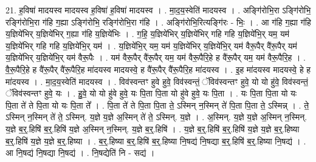 \documentclass[17pt]{extarticle}
\begin{document}
21. ह॒विषा॑ मादयस्व मादयस्व ह॒विषा॑ ह॒विषा॑ मादयस्व । . मा॒द॒य॒स्वेति॑ मादयस्व । . अङ्गि॑रोभि॒रा ऽङ्गि॑रोभि॒ रङ्गि॑रोभि॒रा ग॑हि ग॒ह्या ऽङ्गि॑रोभि॒ रङ्गि॑रोभि॒रा ग॑हि । . अङ्गि॑रोभि॒रित्यङ्गि॑रः - भिः॒ । . आ ग॑हि ग॒ह्या ग॑हि य॒ज्ञिये॑भिर् य॒ज्ञिये॑भिर् ग॒ह्या ग॑हि य॒ज्ञिये॑भिः । . ग॒हि॒ य॒ज्ञिये॑भिर् य॒ज्ञिये॑भिर् गहि गहि य॒ज्ञिये॑भि॒र् यम॒ यम॑ य॒ज्ञिये॑भिर् गहि गहि य॒ज्ञिये॑भि॒र् यम॑ । . य॒ज्ञिये॑भि॒र् यम॒ यम॑ य॒ज्ञिये॑भिर् य॒ज्ञिये॑भि॒र् यम॑ वैरू॒पैर् वै॑रू॒पैर् यम॑ य॒ज्ञिये॑भिर् य॒ज्ञिये॑भि॒र् यम॑ वैरू॒पैः । . यम॑ वैरू॒पैर् वै॑रू॒पैर् यम॒ यम॑ वैरू॒पैरि॒हे ह वै॑रू॒पैर् यम॒ यम॑ वैरू॒पैरि॒ह । . वै॒रू॒पैरि॒हे ह वै॑रू॒पैर् वै॑रू॒पैरि॒ह मा॑दयस्व मादयस्वे॒ ह वै॑रू॒पैर् वै॑रू॒पैरि॒ह मा॑दयस्व । . इ॒ह मा॑दयस्व मादयस्वे॒ हे ह मा॑दयस्व । . मा॒द॒य॒स्वेति॑ मादयस्व । . विव॑स्वन्तꣳ हुवे हुवे॒ विव॑स्वन्तं॒ ॅविव॑स्वन्तꣳ हुवे॒ यो यो हु॑वे॒ विव॑स्वन्तं॒ ॅविव॑स्वन्तꣳ हुवे॒ यः । . हु॒वे॒ यो यो हु॑वे हुवे॒ यः पि॒ता पि॒ता यो हु॑वे हुवे॒ यः पि॒ता । . यः पि॒ता पि॒ता यो यः पि॒ता ते॑ ते पि॒ता यो यः पि॒ता ते᳚ । . पि॒ता ते॑ ते पि॒ता पि॒ता ते॒ ऽस्मिन् न॒स्मिन् ते॑ पि॒ता पि॒ता ते॒ ऽस्मिन्न् । . ते॒ ऽस्मिन् न॒स्मिन् ते॑ ते॒ ऽस्मिन्. य॒ज्ञे य॒ज्ञे अ॒स्मिन् ते॑ ते॒ ऽस्मिन्. य॒ज्ञे । . अ॒स्मिन्. य॒ज्ञे य॒ज्ञे अ॒स्मिन् न॒स्मिन्. य॒ज्ञे ब॒र्॒.हिषि॑ ब॒र्॒.हिषि॑ य॒ज्ञे अ॒स्मिन् न॒स्मिन्. य॒ज्ञे ब॒र्॒.हिषि॑ । . य॒ज्ञे ब॒र्॒.हिषि॑ ब॒र्॒.हिषि॑ य॒ज्ञे य॒ज्ञे ब॒र्॒.हिष्या ब॒र्॒.हिषि॑ य॒ज्ञे य॒ज्ञे ब॒र्॒.हिष्या । . ब॒र्॒.हिष्या ब॒र्॒.हिषि॑ ब॒र्॒.हिष्या नि॒षद्य॑ नि॒षद्या ब॒र्॒.हिषि॑ ब॒र्॒.हिष्या नि॒षद्य॑ । . आ नि॒षद्य॑ नि॒षद्या नि॒षद्य॑ । . नि॒षद्येति॑ नि - सद्य॑ । \newline
\end{document}
